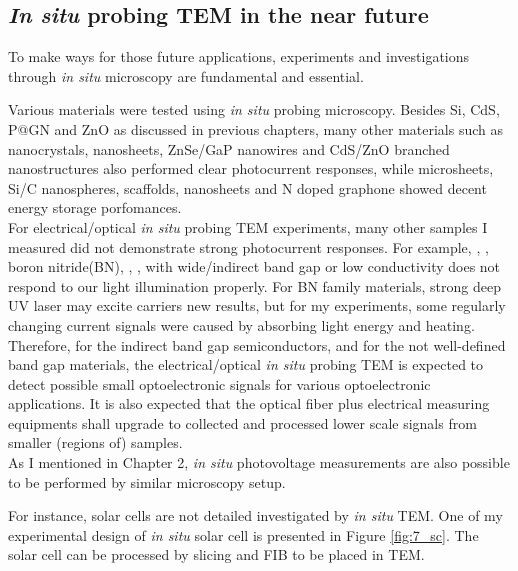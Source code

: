 
\subsection{\textit{In situ} probing TEM in the near future}
\color{red}
To make ways for those future applications, experiments and investigations through \textit{in situ} microscopy are fundamental and essential. 

Various materials were tested using \textit{in situ} probing microscopy. Besides Si, CdS, P@GN and ZnO as discussed in previous chapters, many other materials such as  nanocrystals,  nanosheets, ZnSe/GaP nanowires and CdS/ZnO branched nanostructures also performed clear photocurrent responses, while  microsheets, Si/C nanospheres,  scaffolds,  nanosheets and N doped graphone showed decent energy storage porfomances.\\

For electrical/optical \textit{in situ} probing TEM experiments, many other samples I measured did not demonstrate strong photocurrent responses. For example, , , boron nitride(BN), , ,  with wide/indirect band gap or low conductivity does not respond to our light illumination properly. For BN family materials, strong deep UV laser may excite carriers new results, but for my experiments, some regularly changing current signals were caused by absorbing light energy and heating. \\

Therefore, for the indirect band gap semiconductors, and for the not well-defined band gap materials, the electrical/optical \textit{in situ} probing TEM is expected to detect possible small optoelectronic signals for various optoelectronic applications. It is also expected that the optical fiber plus electrical measuring equipments shall upgrade to collected and processed lower scale signals from smaller (regions of) samples. \\

As I mentioned in Chapter 2, \textit{in situ} photovoltage measurements are also possible to be performed by similar microscopy setup. 


For instance, solar cells are not detailed investigated by \textit{in situ} TEM. One of my experimental design of \textit{in situ} solar cell is presented in Figure \ref{fig:7_sc}. The solar cell can be processed by slicing and FIB to be placed in TEM. \\ 

